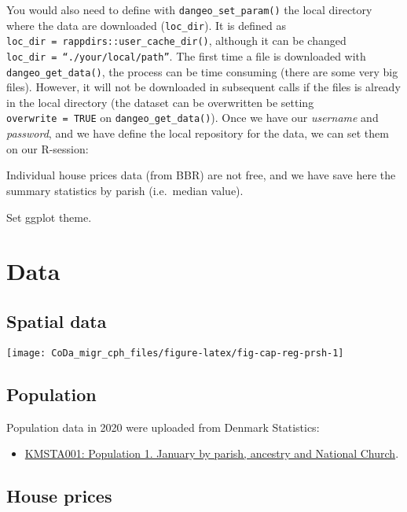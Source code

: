 \documentclass[
  12pt,
]{article}
\providecommand{\tightlist}{%
  \setlength{\itemsep}{0pt}\setlength{\parskip}{0pt}}
\begin{document}
You would also need to define with \texttt{dangeo\_set\_param()} the local directory where the data are downloaded (\texttt{loc\_dir}). It is defined as \texttt{loc\_dir\ =\ rappdirs::user\_cache\_dir()}, although it can be changed \texttt{loc\_dir\ =\ “./your/local/path”}. The first time a file is downloaded with \texttt{dangeo\_get\_data()}, the process can be time consuming (there are some very big files). However, it will not be downloaded in subsequent calls if the files is already in the local directory (the dataset can be overwritten be setting \texttt{overwrite\ =\ TRUE} on \texttt{dangeo\_get\_data()}). Once we have our \emph{username} and \emph{password}, and we have define the local repository for the data, we can set them on our R-session:

Individual house prices data (from BBR) are not free, and we have save here the summary statistics by parish (i.e.~median value).

Set ggplot theme.

\hypertarget{data}{%
\section{Data}\label{data}}

\hypertarget{spatial-data}{%
\subsection{Spatial data}\label{spatial-data}}

\begin{center}\texttt{[image: CoDa\_migr\_cph\_files/figure-latex/fig-cap-reg-prsh-1]} \end{center}

\hypertarget{population}{%
\subsection{Population}\label{population}}

Population data in 2020 were uploaded from Denmark Statistics:

\begin{itemize}
\tightlist
\item
  \href{https://www.statbank.dk/statbank5a/SelectVarVal/Define.asp?MainTable=KMSTA001\&PLanguage=1\&PXSId=0\&wsid=cftree}{KMSTA001: Population 1. January by parish, ancestry and National Church}.
\end{itemize}

\hypertarget{house-prices}{%
\subsection{House prices}\label{house-prices}}
\end{document}
